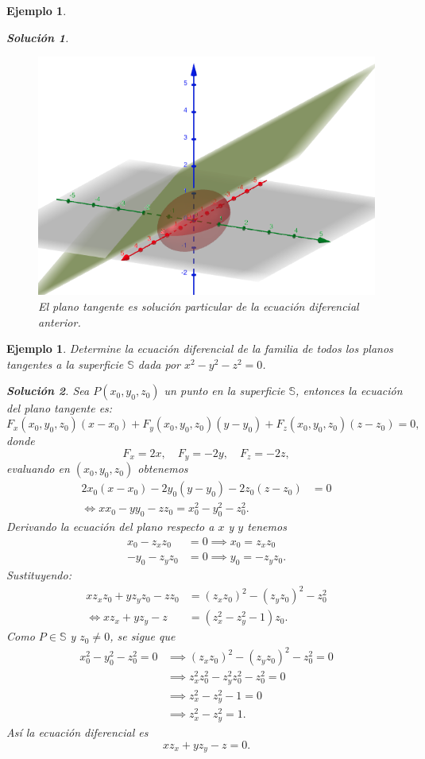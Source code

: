 \documentclass[11pt,letterpaper]{report}
\newtheorem{example}[defn]{Ejemplo}
\newtheorem*{sol}{Solución}
\newcommand\<{\langle}
\renewcommand\>{\rangle}
\begin{document}
\begin{example}
\begin{sol}
    \begin{figure}[ht]
      \centering
      \includegraphics[width=0.5\linewidth]{imgs/chap1-tangent.png}
      \caption{El plano tangente es solución particular de
      la ecuación diferencial anterior.}%
      \label{fig:chap1-tangent}
    \end{figure}
  \end{sol}
\end{example}

\begin{example}
  Determine la ecuación diferencial de la familia de todos los planos tangentes
  a la superficie $\mathbb{S}$ dada por $x^2 - y^2 - z^2 = 0$.

  \begin{sol}
    Sea $P(x_0,y_0,z_0)$ un punto en la superficie $\mathbb{S}$, entonces la
    ecuación del plano tangente es:
    \[
    F_x(x_0,y_0,z_0)(x-x_0) + F_y(x_0,y_0,z_0)(y-y_0) + F_z(x_0,y_0,z_0)(z-z_0)
    = 0,
    \] donde 
    \[
    F_x = 2x, \quad F_y = -2y, \quad F_z = -2z,
    \] evaluando en $(x_0,y_0,z_0)$ obtenemos
    \begin{align*}
      2x_0(x-x_0) - 2y_0(y-y_0) - 2z_0(z-z_0) &= 0\\
      \iff xx_0 - yy_0 - zz_0 = x_0^2 - y_0^2 - z_0^2.
    \end{align*}
    Derivando la ecuación del plano respecto a $x$ y $y$ tenemos
    \begin{align*}
      x_0 - z_x z_0 &= 0 \implies x_0 = z_x z_0\\
      -y_0 - z_y z_0 &= 0 \implies y_0 = -z_y z_0.
    \end{align*}
    Sustituyendo:
    \begin{align*}
      x z_x z_0 + y z_y z_0 - z z_0 &= (z_x z_0)^2 - (z_y z_0)^2 - z_0^2\\
      \iff x z_x + y z_y - z &= (z_x^2 - z_y^2 - 1) z_0.
    \end{align*}
    Como $P \in \mathbb{S}$ y $z_0 \neq 0$, se sigue que
    \begin{align*}
      x_0^2 - y_0^2 - z_0^2 = 0 &\implies (z_x z_0)^2 - (z_y z_0)^2 - z_0^2 =
      0\\
                                &\implies z_x^2 z_0^2 - z_y^2 z_0^2 - z_0^2 =
                                0\\
                                &\implies z_x^2 - z_y^2 - 1 = 0\\
                                &\implies z_x^2 - z_y^2 = 1.
    \end{align*} Así la ecuación diferencial es
    \[
    x z_x + y z_y - z = 0.
    \] 
  \end{sol}
\end{example}
\end{document}
